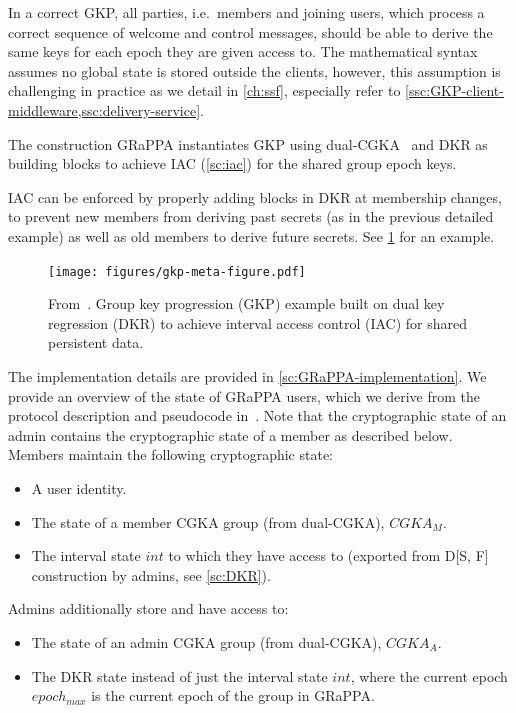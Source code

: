 In a correct GKP, all parties, i.e.\ members and joining users, which process a correct
sequence of welcome and control messages, should be able to derive the same keys
for each epoch they are given access to. The mathematical syntax assumes
no global state is stored outside the clients, however, this assumption is challenging
in practice as we detail in \cref{ch:ssf},
especially refer to \cref{ssc:GKP-client-middleware,ssc:delivery-service}.

The construction GRaPPA instantiates GKP using dual-CGKA~\cite{USENIX:BalColVau23}
and DKR \cite{GKP} as building blocks to achieve IAC (\cref{sc:iac}) for the shared group epoch keys.

IAC can be enforced by properly adding blocks in DKR at membership
changes, to prevent new members from deriving past secrets (as in the previous detailed example)
as well as old members to derive future secrets. See \cref{fig:gkp-iac} for an example.

\begin{figure}[t]
	\centering
	\texttt{[image: figures/gkp-meta-figure.pdf]}
	\caption{
        From~\cite{GKP}.
        Group key progression (GKP) example built on dual key regression (DKR) to achieve interval access control
        (IAC) for shared persistent data.
        \label{fig:gkp-iac}}
\end{figure}

The implementation details are provided in \cref{sc:GRaPPA-implementation}.
We provide an overview of the state of GRaPPA users, which we derive from the protocol description and pseudocode in~\cite{GKP}. 
Note that the cryptographic state of an admin contains the cryptographic state of a member as described below.
Members maintain the following cryptographic state:
\begin{itemize}
    \item A user identity.
    \item The state of a member CGKA group (from dual-CGKA), $CGKA_M$.
    \item The interval state $int$ to which they have access to (exported from D[S, F] construction by admins, see \cref{sc:DKR}).
\end{itemize}
Admins additionally store and have access to:
\begin{itemize}
    \item The state of an admin CGKA group (from dual-CGKA), $CGKA_A$.
    \item The DKR state instead of just the interval state $int$, where the current epoch $epoch_{max}$ is the current epoch of the group in GRaPPA.
\end{itemize}


